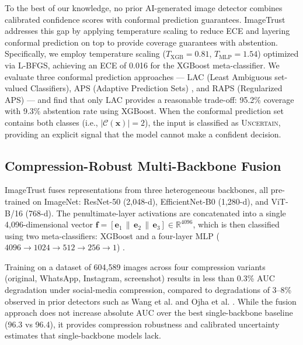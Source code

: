 To the best of our knowledge, no prior AI-generated image detector combines calibrated confidence scores with conformal prediction guarantees. ImageTrust addresses this gap by applying temperature scaling to reduce ECE and layering conformal prediction on top to provide coverage guarantees with abstention. Specifically, we employ temperature scaling ($T_{\text{XGB}} = 0.81$, $T_{\text{MLP}} = 1.54$) optimized via L-BFGS, achieving an ECE of 0.016 for the XGBoost meta-classifier. We evaluate three conformal prediction approaches --- LAC (Least Ambiguous set-valued Classifiers), APS (Adaptive Prediction Sets) \cite{romano2020classification}, and RAPS (Regularized APS) \cite{angelopoulos2021uncertainty} --- and find that only LAC provides a reasonable trade-off: 95.2\% coverage with 9.3\% abstention rate using XGBoost. When the conformal prediction set contains both classes (i.e., $|\mathcal{C}(\mathbf{x})| = 2$), the input is classified as \textsc{Uncertain}, providing an explicit signal that the model cannot make a confident decision.


\subsection{Compression-Robust Multi-Backbone Fusion}\label{sec:contrib-fusion}

ImageTrust fuses representations from three heterogeneous backbones, all pre-trained on ImageNet: ResNet-50 \cite{he2016deep} (2,048-d), EfficientNet-B0 \cite{tan2019efficientnet} (1,280-d), and ViT-B/16 \cite{dosovitskiy2021image} (768-d). The penultimate-layer activations are concatenated into a single 4,096-dimensional vector $\mathbf{f} = [\mathbf{e}_1 \,\|\, \mathbf{e}_2 \,\|\, \mathbf{e}_3] \in \mathbb{R}^{4096}$, which is then classified using two meta-classifiers: XGBoost \cite{chen2016xgboost} and a four-layer MLP ($4096 \to 1024 \to 512 \to 256 \to 1$) \cite{rumelhart1986learning}.

Training on a dataset of 604,589 images across four compression variants (original, WhatsApp, Instagram, screenshot) results in less than 0.3\% AUC degradation under social-media compression, compared to degradations of 3--8\% observed in prior detectors such as Wang et al. \cite{wang2020cnn} and Ojha et al. \cite{ojha2023towards}. While the fusion approach does not increase absolute AUC over the best single-backbone baseline (96.3 vs 96.4), it provides compression robustness and calibrated uncertainty estimates that single-backbone models lack.


